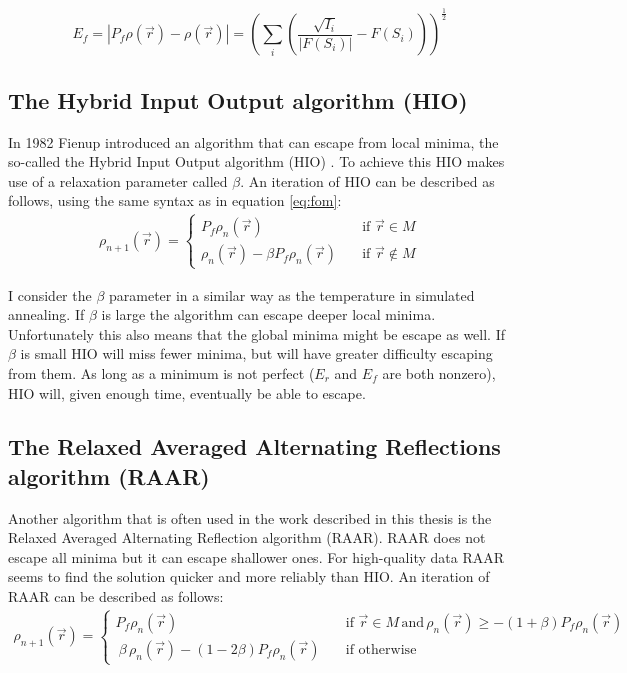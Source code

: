 \begin{equation}
E_f = \left|P_f\rho(\vec{r}) - \rho(\vec{r})\right| = \left(\sum_{i}\left(\frac{\sqrt{I_i}}{|F(S_i)|}- F(S_i)\right)\right)^{\frac{1}{2}}
\end{equation}
  
\subsection{The Hybrid Input Output algorithm (HIO)}
In 1982 Fienup introduced an algorithm that can escape from local minima, the so-called the Hybrid Input Output algorithm (HIO) \cite{Fienup1982}. To achieve this HIO makes use of a relaxation parameter called $\beta$. An iteration of HIO can be described as follows, using the same syntax as in equation \ref{eq:fom}:
\begin{align}
\rho_{n+1}\left(\vec{r}\right) = \begin{cases} P_f \rho_{n}\left(\vec{r}\right) \quad &\mathrm{if}\,\,
    \vec{r} \in M\\\rho_n(\vec{r}) -\beta P_f \rho_n(\vec{r}) \quad & \mathrm{if}\,\, \vec{r} \not\in M \end{cases}
\end{align}

I consider the $\beta$ parameter in a similar way as the temperature in simulated annealing. If $\beta$ is large the algorithm can escape deeper local minima. Unfortunately this also means that the global minima might be escape as well. If $\beta$ is small HIO will miss fewer minima, but will have greater difficulty escaping from them. As long as a minimum is not perfect ($E_r$ and $E_f$ are both nonzero), HIO will, given enough time, eventually be able to escape.

\subsection{The Relaxed Averaged Alternating Reflections algorithm (RAAR)}
Another algorithm that is often used in the work described in this thesis is the Relaxed Averaged Alternating Reflection algorithm (RAAR). RAAR does not escape all minima but it can escape shallower ones. For high-quality data RAAR seems to find the solution quicker and more reliably than HIO. An iteration of RAAR can be described as follows:
\begin{align}
\rho_{n+1}\left(\vec{r}\right) = \begin{cases} P_f \rho_{n}\left(\vec{r}\right) \quad & \mathrm{if} \,\,
    \vec{r} \in M\,\mathrm{and}\,\rho_n(\vec{r}) \geq -(1+\beta)P_f\rho_n(\vec{r}) \\\
    \beta\,\rho_n(\vec{r}) -(1-2\beta) P_f \rho_n(\vec{r}) \quad & \mathrm{if}\,\, \mathrm{otherwise} \end{cases}
\end{align}

